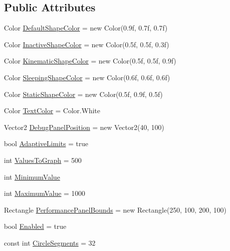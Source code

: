\subsection*{Public Attributes}
\begin{DoxyCompactItemize}
\item 
Color \hyperlink{class_farseer_physics_1_1_debug_views_1_1_debug_view_x_n_a_a1fcf6a297b9a650d61c6eb3975034de6}{Default\+Shape\+Color} = new Color(0.\+9f, 0.\+7f, 0.\+7f)
\item 
Color \hyperlink{class_farseer_physics_1_1_debug_views_1_1_debug_view_x_n_a_a3687289d48f3c0c7b66b68e99e533622}{Inactive\+Shape\+Color} = new Color(0.\+5f, 0.\+5f, 0.\+3f)
\item 
Color \hyperlink{class_farseer_physics_1_1_debug_views_1_1_debug_view_x_n_a_ac339e99337c43588035b07b798b86dae}{Kinematic\+Shape\+Color} = new Color(0.\+5f, 0.\+5f, 0.\+9f)
\item 
Color \hyperlink{class_farseer_physics_1_1_debug_views_1_1_debug_view_x_n_a_a0a62aa35edab36c58407cb5ebef29ed4}{Sleeping\+Shape\+Color} = new Color(0.\+6f, 0.\+6f, 0.\+6f)
\item 
Color \hyperlink{class_farseer_physics_1_1_debug_views_1_1_debug_view_x_n_a_afcd0e17376d6376f4cf86222513d6e23}{Static\+Shape\+Color} = new Color(0.\+5f, 0.\+9f, 0.\+5f)
\item 
Color \hyperlink{class_farseer_physics_1_1_debug_views_1_1_debug_view_x_n_a_a6a6df24c4abbe85b2442ddf9f6976155}{Text\+Color} = Color.\+White
\item 
Vector2 \hyperlink{class_farseer_physics_1_1_debug_views_1_1_debug_view_x_n_a_a576632d8b6c6b462036a77cdcffc7758}{Debug\+Panel\+Position} = new Vector2(40, 100)
\item 
bool \hyperlink{class_farseer_physics_1_1_debug_views_1_1_debug_view_x_n_a_a5fb446e6cc811636693f1f9a829f3579}{Adaptive\+Limits} = true
\item 
int \hyperlink{class_farseer_physics_1_1_debug_views_1_1_debug_view_x_n_a_a26b28c2306bbad804bcbfc36957f86c6}{Values\+To\+Graph} = 500
\item 
int \hyperlink{class_farseer_physics_1_1_debug_views_1_1_debug_view_x_n_a_ac73e104c662748920b4e4a4b9a2f86e8}{Minimum\+Value}
\item 
int \hyperlink{class_farseer_physics_1_1_debug_views_1_1_debug_view_x_n_a_ae105d24209925046b4c841c36d82270e}{Maximum\+Value} = 1000
\item 
Rectangle \hyperlink{class_farseer_physics_1_1_debug_views_1_1_debug_view_x_n_a_adb9f9ea3431e3b457263fde9ef090c0d}{Performance\+Panel\+Bounds} = new Rectangle(250, 100, 200, 100)
\item 
bool \hyperlink{class_farseer_physics_1_1_debug_views_1_1_debug_view_x_n_a_abd4aa06bc1d5e05f6abaa69abf41fc11}{Enabled} = true
\item 
const int \hyperlink{class_farseer_physics_1_1_debug_views_1_1_debug_view_x_n_a_a816de98d7cab5baaa04565e9523c5199}{Circle\+Segments} = 32
\end{DoxyCompactItemize}
